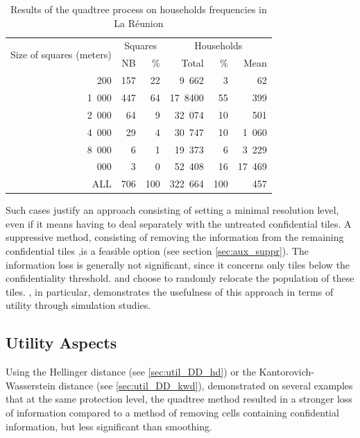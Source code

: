 \begin{table}[H]
\footnotesize
\centering
\begin{tabular}[t]{rrrrrr}
\toprule
\multirow{2}{*}{Size of squares (meters)} & \multicolumn{2}{c}{Squares} & \multicolumn{3}{c}{Households} \\
\cmidrule{2-3} \cmidrule{4-6}
 & NB & \% & Total & \% & Mean \\
\midrule
200 & 157 & 22 & 9~662  &  3 & 62\\
1~000 & 447 & 64 & 17~8400 & 55 & 399 \\
2~000 & 64 & 9 & 32~074 & 10 & 501 \\
4~000 & 29 & 4 & 30~747 & 10 & 1~060\\
8~000 & 6 & 1 & 19~373 & 6 & 3~229\\
\addlinespace
16~000 & 3 & 0 & 52~408 & 16 & 17~469\\
ALL & 706 & 100 & 322~664 & 100 & 457\\
\bottomrule
\end{tabular}
\caption{Results of the quadtree process on households frequencies in La Réunion}
\label{tab:quadtree_reunion_summary}
\end{table}


Such cases justify an approach consisting of setting a minimal resolution level, even if it means having to deal separately with the untreated confidential tiles. A suppressive method, consisting of removing the information from the remaining confidential tiles ,is a feasible option (see section \ref{sec:aux_suppr}). The information loss is generally not significant, since it concerns only tiles below the confidentiality threshold. \citet{Lagonigro_Oller_Martori_2017} and \citet{Suñé_Ibáñez_2017} choose to randomly relocate the population of these tiles. \citet{Suñé_Ibáñez_2017}, in particular, demonstrates the usefulness of this approach in terms of utility through simulation studies.


\subsection{Utility Aspects}

Using the Hellinger distance (see \ref{sec:util_DD_hd}) or the Kantorovich-Wasserstein distance (see \ref{sec:util_DD_kwd}), \cite{GussenbauerEtAl2023} demonstrated on several examples that at the same protection level, the quadtree method resulted in a stronger loss of information compared to a method of removing cells containing confidential information, but less significant than smoothing.

